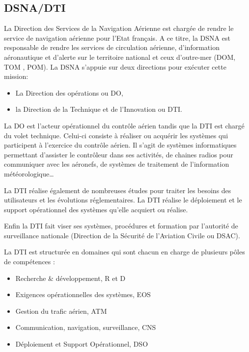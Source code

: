     \subsection{DSNA/DTI}
La Direction des Services de la Navigation Aérienne est chargée de rendre le service de navigation aérienne pour l’Etat français. A ce titre, la DSNA est responsable de rendre les services de circulation aérienne, d’information aéronautique et d’alerte sur le territoire national et ceux d’outre-mer (DOM, TOM , POM). La DSNA s’appuie sur deux directions pour exécuter cette mission:
\begin{itemize}
\item La Direction des opérations ou DO,
\item la Direction de la Technique et de l’Innovation ou DTI.
\end{itemize}
La DO est l’acteur opérationnel du contrôle aérien tandis que la DTI est chargé du volet technique. Celui-ci consiste à réaliser ou acquérir les systèmes qui participent à l’exercice du contrôle aérien. Il s’agit de systèmes informatiques permettant d’assister le contrôleur dans ses activités, de chaines radios pour communiquer avec les aéronefs, de systèmes de traitement de l’information météorologique…

La DTI réalise également de nombreuses études pour traiter les besoins des utilisateurs et les évolutions réglementaires. La DTI réalise le déploiement et le support opérationnel des systèmes qu’elle acquiert ou réalise. 

Enfin la DTI fait viser ses systèmes, procédures et formation par l’autorité de surveillance nationale (Direction de la Sécurité de l'Aviation Civile ou DSAC).

La DTI est structurée en domaines qui sont chacun en charge de plusieurs pôles de compétences :
\begin{itemize}
\item Recherche \& développement, R et D
\item Exigences opérationnelles des systèmes, EOS
\item Gestion du trafic aérien, ATM
\item Communication, navigation, surveillance, CNS
\item Déploiement et Support Opérationnel, DSO
\end{itemize}

